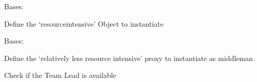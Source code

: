 \documentclass[letterpaper,10pt,english]{sphinxmanual}
\begin{document}
\begin{fulllineitems}
\label{\detokenize{StructuralPattern:StructuralPattern.proxy.Producer}}
\pysigstartsignatures
{}
\pysigstopsignatures
\sphinxAtStartPar
Bases: 

\sphinxAtStartPar
Define the ‘resource\sphinxhyphen{}intensive’ Object to instantiate

\begin{fulllineitems}
\label{\detokenize{StructuralPattern:StructuralPattern.proxy.Producer.meet}}
\pysigstartsignatures
{}
\pysigstopsignatures
\end{fulllineitems}


\begin{fulllineitems}
\label{\detokenize{StructuralPattern:StructuralPattern.proxy.Producer.producer}}
\pysigstartsignatures
{}
\pysigstopsignatures
\end{fulllineitems}


\end{fulllineitems}


\begin{fulllineitems}
\label{\detokenize{StructuralPattern:StructuralPattern.proxy.Proxy}}
\pysigstartsignatures
{}
\pysigstopsignatures
\sphinxAtStartPar
Bases: 

\sphinxAtStartPar
Define the ‘relatively less resource intensive’ proxy to instantiate as middleman

\begin{fulllineitems}
\label{\detokenize{StructuralPattern:StructuralPattern.proxy.Proxy.produce}}
\pysigstartsignatures
{}
\pysigstopsignatures
\sphinxAtStartPar
Check if the Team Lead is available

\end{fulllineitems}


\end{fulllineitems}
\end{document}
